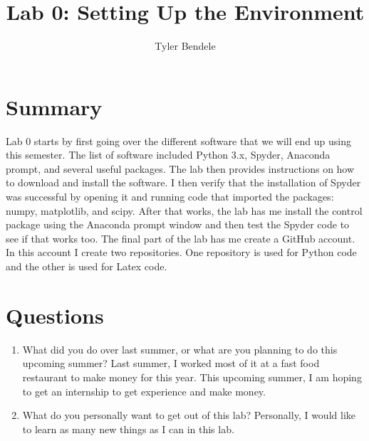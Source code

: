 \documentclass{article}
\title{Lab 0: Setting Up the Environment}
\author{Tyler Bendele}
\begin{document}
\maketitle


\section{Summary}

Lab 0 starts by first going over the different software that we will end up using this semester. The list of software included Python 3.x, Spyder, Anaconda prompt, and several useful packages. The lab then provides instructions on how to download and install the software. I then verify that the installation of Spyder was successful by opening it and running code that imported the packages: numpy, matplotlib, and scipy. After that works, the lab has me install the control package using the Anaconda prompt window and then test the Spyder code to see if that works too. The final part of the lab has me create a GitHub account. In this account I create two repositories. One repository is used for Python code and the other is used for Latex code.

\section{Questions}
\begin{enumerate}
\item What did you do over last summer, or what are you planning to do this upcoming summer?
\newline
Last summer, I worked most of it at a fast food restaurant to make money for this year. This upcoming summer, I am hoping to get an internship to get experience and make money.

\item What do you personally want to get out of this lab?
\newline
Personally, I would like to learn as many new things as I can in this lab. 
\end{enumerate}
\end{document}
